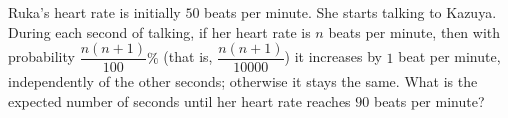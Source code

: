 Ruka's heart rate is initially $50$ beats per minute. She starts talking to Kazuya. During each second of talking, if her heart rate is $n$ beats per minute, then with probability $\dfrac{n(n+1)}{100}\%$ (that is, $\dfrac{n(n+1)}{10000}$) it increases by $1$ beat per minute, independently of the other seconds; otherwise it stays the same. What is the expected number of seconds until her heart rate reaches $90$ beats per minute?
